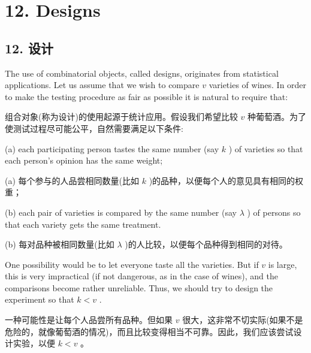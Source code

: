 \documentclass[10pt]{article}
\begin{document}
\section*{12. Designs}

\begin{tcolorbox}\relax
\section*{12. 设计}
\end{tcolorbox}

The use of combinatorial objects, called designs, originates from statistical applications. Let us assume that we wish to compare \(v\) varieties of wines. In order to make the testing procedure as fair as possible it is natural to require that:

\begin{tcolorbox}\relax
组合对象(称为设计)的使用起源于统计应用。假设我们希望比较 \(v\) 种葡萄酒。为了使测试过程尽可能公平，自然需要满足以下条件:
\end{tcolorbox}

(a) each participating person tastes the same number (say \(k\) ) of varieties so that each person's opinion has the same weight;

\begin{tcolorbox}\relax
(a) 每个参与的人品尝相同数量(比如 \(k\) )的品种，以便每个人的意见具有相同的权重；
\end{tcolorbox}

(b) each pair of varieties is compared by the same number (say \(\lambda\) ) of persons so that each variety gets the same treatment.

\begin{tcolorbox}\relax
(b) 每对品种被相同数量(比如 \(\lambda\) )的人比较，以便每个品种得到相同的对待。
\end{tcolorbox}

One possibility would be to let everyone taste all the varieties. But if \(v\) is large, this is very impractical (if not dangerous, as in the case of wines), and the comparisons become rather unreliable. Thus, we should try to design the experiment so that \(k < v\) .

\begin{tcolorbox}\relax
一种可能性是让每个人品尝所有品种。但如果 \(v\) 很大，这非常不切实际(如果不是危险的，就像葡萄酒的情况)，而且比较变得相当不可靠。因此，我们应该尝试设计实验，以便 \(k < v\) 。
\end{tcolorbox}
\end{document}
